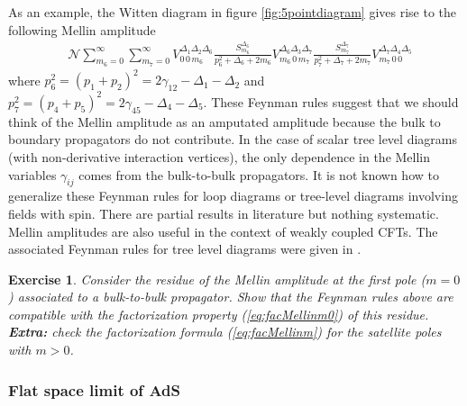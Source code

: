 \documentclass{ws-rv9x6}
\newtheorem{exercise}{Exercise}[section]
\newcommand\D{\Delta}
\newcommand\g{\gamma}
\begin{document}
As an example, the Witten diagram in figure \ref{fig:5pointdiagram} gives rise to the following Mellin amplitude
\begin{align}
&\mathcal{N}\sum_{m_6=0}^\infty \sum_{m_7=0}^\infty 
 V^{\Delta_1\D_2 \D_6}_{0\,0\, m_6}
\frac{S_{m_6}^{\D_6}}{p_6^2 +\Delta_6+2m_6} 
V^{\Delta_6\D_3 \D_7}_{m_6\,0\, m_7}
\frac{S_{m_7}^{\D_7}}{p_7^2 +\Delta_7+2m_7} 
V^{\Delta_7\D_4 \D_5}_{m_7\,0\, 0}
\nonumber
\end{align}
where $p_6^2=(p_1+p_2)^2=2\g_{12}-\D_1-\D_2$ and $p_7^2=(p_4+p_5)^2=2\g_{45}-\D_4-\D_5$.
These Feynman rules suggest that we should think of the Mellin amplitude as an amputated amplitude because the bulk to boundary propagators do not contribute. In the case of scalar tree level diagrams (with non-derivative interaction vertices), the only dependence in the Mellin variables $\gamma_{ij}$ comes from the bulk-to-bulk propagators. %
It is not known how to generalize these Feynman rules for loop diagrams or tree-level diagrams involving fields with spin. There are partial results in literature \cite{Paulos:2011ie, Goncalves:2014rfa} but nothing systematic.
Mellin amplitudes are also useful in the context of weakly coupled CFTs. The associated Feynman rules for tree level diagrams were given in \cite{Nizami:2016jgt}.

\begin{exercise}
Consider the residue of the Mellin amplitude at the first pole ($m=0$) associated to a bulk-to-bulk propagator.
Show that the Feynman rules above are compatible with the factorization property (\ref{eq:facMellinm0}) of this residue.
{\bf Extra:} check  the factorization formula (\ref{eq:facMellinm}) for the satellite poles with $m>0$.
\end{exercise}

\subsubsection{Flat space limit of AdS \label{sec:FSL}}
\end{document}
